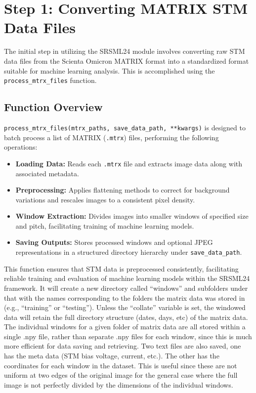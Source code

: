 \documentclass[11pt]{article}
\begin{document}
\pagebreak

\section*{Step 1: Converting MATRIX STM Data Files}

The initial step in utilizing the SRSML24 module involves converting raw STM data files from the Scienta Omicron MATRIX format into a standardized format suitable for machine learning analysis. This is accomplished using the \texttt{process\_mtrx\_files} function.

\subsection*{Function Overview}

\texttt{process\_mtrx\_files(mtrx\_paths, save\_data\_path, **kwargs)} is designed to batch process a list of MATRIX (\texttt{.mtrx}) files, performing the following operations:

\begin{itemize}
  \item \textbf{Loading Data:} Reads each \texttt{.mtrx} file and extracts image data along with associated metadata.
  \item \textbf{Preprocessing:} Applies flattening methods to correct for background variations and rescales images to a consistent pixel density.
  \item \textbf{Window Extraction:} Divides images into smaller windows of specified size and pitch, facilitating training of machine learning models.
  \item \textbf{Saving Outputs:} Stores processed windows and optional JPEG representations in a structured directory hierarchy under \texttt{save\_data\_path}.
\end{itemize}

This function ensures that STM data is preprocessed consistently, facilitating reliable training and evaluation of machine learning models within the SRSML24 framework. It will create a new directory called ``windows'' and subfolders under that with the names corresponding to the folders the matrix data was stored in (e.g., ``training'' or ``testing''). Unless the ``collate'' variable is set, the windowed data will retain the full directory structure (dates, days, etc) of the matrix data. The individual windows for a given folder of matrix data are all stored within a single .npy file, rather than separate .npy files for each window, since this is much more efficient for data saving and retrieving. Two text files are also saved, one has the meta data (STM bias voltage, current, etc.). The other has the coordinates for each window in the dataset. This is useful since these are not uniform at two edges of the original image for the general case where the full image is not perfectly divided by the dimensions of the individual windows. 
\end{document}
